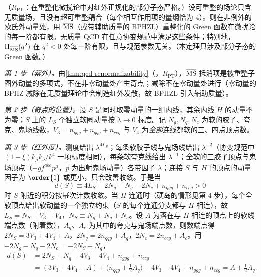 \begin{theorem}\label{thm:ee-euclid-ir}
（$R_{\mathrm{PT}}$：在重整化微扰论中对红外正规化的部分子态严格。）设可重整的场论只含无质量场，且没有超可重整耦合（每个相互作用项的量纲恰为 $4$）。则在非例外的欧氏外动量处，用 $\overline{\rm MS}$（或带辅助质量的 BPHZL）重整化的 Green 函数在微扰论的每一阶都有限。无质量 QCD 在任意协变规范中满足这些条件；特别地，$\Pi_{\overline{\rm MS}}(q^2)$ 在 $q^2<0$ 处每一阶有限，且与规范参数无关。（本定理只涉及部分子态的 Green 函数。）
\end{theorem}
\begin{proofsketch}
\emph{第 1 步（紫外）。}由\cref{thm:qcd-renormalizability}（\tagR，$R_{\mathrm{PT}}$），$\overline{\rm MS}$ 抵消项是被重整子图外动量的多项式，不在非零动量处产生奇点；减除不在零动量处进行（零动量的 BPHZ 减除在无质量理论中会制造红外发散，故 BPHZL 引入辅助质量\cite{LowensteinZimmermann1975}）。

\emph{第 2 步（奇点的位置）。}设 $S$ 是同时取零动量的一组内线，其余内线 $H$ 的动量不为零；$S$ 上的 $L_S$ 个独立软圈动量按 $\lambda\to0$ 标度。记 $N_g,N_q,N_c$ 为软的胶子、夸克、鬼场线数，$V_3=n_{ggg}+n_{qqg}+n_{ccg}$ 与 $V_4$ 为\emph{全部}连线都软的三、四点顶点数。

\emph{第 3 步（红外度）。}测度给出 $\lambda^{4L_S}$；每条软胶子线与鬼场线给出 $\lambda^{-2}$（协变规范中 $(1-\xi)k_\mu k_\nu/k^4$ 一项标度相同），每条软夸克线给出 $\lambda^{-1}$；全软的三胶子顶点与鬼场顶点（$-gf^{abc}p^\mu$，$p$ 为出射鬼场动量）各带因子 $\lambda$；连接 $S$ 与 $H$ 的顶点的动量因子为 $\order{1}$ 或更小，只会改善收敛。于是当
\begin{equation}\label{eq:ee-irdeg}
d(S)\equiv4L_S-2N_g-N_q-2N_c+n_{ggg}+n_{ccg}>0
\end{equation}
时 $S$ 附近的积分按幂次计数收敛。当 $H$ 连通时（硬岛的情形见第 4 步），每个全软顶点给出软动量的一个独立约束（$S$ 的每个连通分支都与 $H$ 相连），故 $L_S=N_S-V_3-V_4$，$N_S\equiv N_g+N_q+N_c$。设 $A$ 为落在与 $H$ 相连的顶点上的软线端点数（附着数），$A_q$、$A_c$ 为其中的夸克与鬼场端点数，则数端点得 $2N_S=3V_3+4V_4+A$，$2N_q=2n_{qqg}+A_q$，$2N_c=2n_{ccg}+A_c$。用 $-2N_g-N_q-2N_c=-2N_S+N_q$，
\begin{equation}\label{eq:ee-irdeg2}
\begin{split}
d(S)&=2N_S+N_q-4V_3-4V_4+n_{ggg}+n_{ccg}\\
&=(3V_3+4V_4+A)+\big(n_{qqg}+\tfrac12A_q\big)-4V_3-4V_4+n_{ggg}+n_{ccg}=A+\tfrac12A_q .
\end{split}
\end{equation}


\end{proofsketch}
